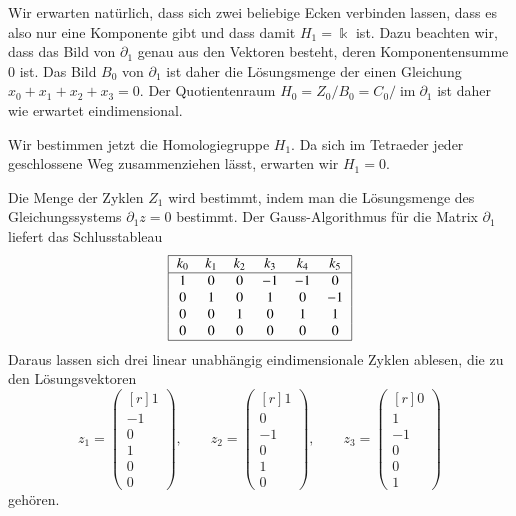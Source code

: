 \begin{beispiel}
Wir erwarten natürlich, dass sich zwei beliebige Ecken verbinden lassen,
dass es also nur eine Komponente gibt und dass damit $H_1=\Bbbk$ ist.
Dazu beachten wir, dass das Bild von $\partial_1$ genau aus den Vektoren
besteht, deren Komponentensumme $0$ ist.
Das Bild $B_0$ von $\partial_1$ ist daher die Lösungsmenge der einen
Gleichung
\(
x_0+x_1+x_2+x_3=0.
\)
Der Quotientenraum $H_0=Z_0/B_0 = C_0/\operatorname{im}\partial_1$
ist daher wie erwartet eindimensional.

Wir bestimmen jetzt die Homologiegruppe $H_1$.
Da sich im Tetraeder jeder geschlossene Weg zusammenziehen lässt,
erwarten wir $H_1=0$.

Die Menge der Zyklen $Z_1$ wird bestimmt, indem man die Lösungsmenge
des Gleichungssystems $\partial_1z=0$ bestimmt.
Der Gauss-Algorithmus für die Matrix $\partial_1$ liefert das
Schlusstableau
\[
\begin{tabular}{|>{$}c<{$}>{$}c<{$}>{$}c<{$}>{$}c<{$}>{$}c<{$}>{$}c<{$}|}
\hline
k_0&k_1&k_2&k_3&k_4&k_5\\
\hline
   1&  0&  0& -1& -1&  0\\
   0&  1&  0&  1&  0& -1\\
   0&  0&  1&  0&  1&  1\\
   0&  0&  0&  0&  0&  0\\
\hline
\end{tabular}
\]
Daraus lassen sich drei linear unabhängig eindimensionale Zyklen ablesen,
die zu den Lösungsvektoren
\[
z_1
=
\begin{pmatrix*}[r]
1\\
-1\\
0\\
1\\
0\\
0
\end{pmatrix*},
\qquad
z_2
=
\begin{pmatrix*}[r]
1\\
0\\
-1\\
0\\
1\\
0
\end{pmatrix*},
\qquad
z_3
=
\begin{pmatrix*}[r]
0\\
1\\
-1\\
0\\
0\\
1
\end{pmatrix*}
\]
gehören.


\end{beispiel}
